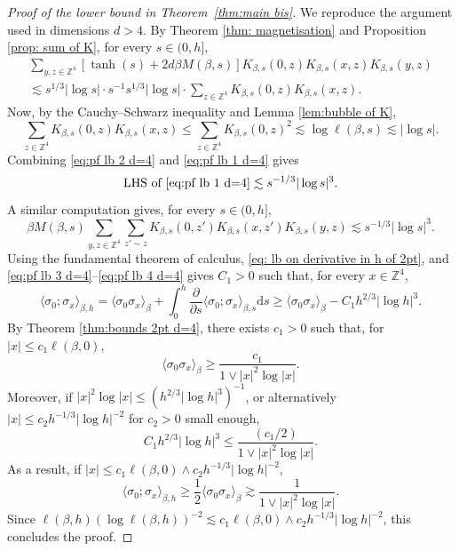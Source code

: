 \documentclass[11pt,a4paper]{article}
\numberwithin{equation}{section}
\theoremstyle{plain}
\theoremstyle{definition}
\begin{document}
\begin{proof}[Proof of the lower bound in Theorem~\textup{\ref{thm:main bis}}] We reproduce the argument used in dimensions $d>4$. By Theorem \ref{thm: magnetisation} and Proposition \ref{prop: sum of K}, for every $s\in (0,h]$,
\begin{multline}\label{eq:pf lb 1 d=4}
	\sum_{y,z\in \mathbb Z^4}[\tanh(s)+2d\beta M(\beta,s)]K_{\beta,s}(0,z)K_{\beta,s}(x,z)K_{\beta,s}(y,z)\\\lesssim s^{1/3}|\log s|\cdot s^{-1} s^{1/3}|\log s| \cdot \sum_{z\in \mathbb Z^4}K_{\beta,s}(0,z)K_{\beta,s}(x,z).
\end{multline}
Now, by the Cauchy--Schwarz inequality and Lemma \ref{lem:bubble of K},
\begin{equation}\label{eq:pf lb 2 d=4}
	\sum_{z\in \mathbb Z^4}K_{\beta,s}(0,z)K_{\beta,s}(x,z)\leq \sum_{z\in \mathbb Z^4} K_{\beta,s}(0,z)^2\lesssim \log \ell(\beta,s)\lesssim |\log s|.
\end{equation}
Combining \eqref{eq:pf lb 2 d=4} and \eqref{eq:pf lb 1 d=4} gives
\begin{equation}\label{eq:pf lb 3 d=4}
	\textup{LHS of \eqref{eq:pf lb 1 d=4}}\lesssim s^{-1/3}|\log s|^3.
\end{equation}
A similar computation gives, for every $s\in(0,h]$,
\begin{equation}\label{eq:pf lb 4 d=4}
	\beta M(\beta,s)\sum_{y,z\in \mathbb Z^4}\sum_{z'\sim z}K_{\beta,s}(0,z')K_{\beta,s}(x,z')K_{\beta,s}(y,z)\lesssim s^{-1/3}|\log s|^3.
\end{equation}
Using the fundamental theorem of calculus, \eqref{eq: lb on derivative in h of 2pt}, and \eqref{eq:pf lb 3 d=4}--\eqref{eq:pf lb 4 d=4} gives $C_1>0$ such that, for every $x\in \mathbb Z^4$,
\begin{equation}\label{eq:pf lb 5 d=4}
	\langle \sigma_0;\sigma_x\rangle_{\beta,h}=\langle \sigma_0\sigma_x\rangle_\beta+\int_0^h \frac{\partial}{\partial s}\langle \sigma_0;\sigma_x\rangle_{\beta,s}\mathrm{d}s\geq \langle \sigma_0\sigma_x\rangle_{\beta}-C_1 h^{2/3}|\log h|^3.
\end{equation}
By Theorem \ref{thm:bounds 2pt d=4}, there exists $c_1>0$ such that, for $|x|\leq c_1\ell(\beta,0)$, 
\begin{equation}
\langle \sigma_0\sigma_x\rangle_{\beta}\geq \frac{c_1}{1\vee |x|^2\log |x|}.
\end{equation}
Moreover, if $|x|^2\log |x|\leq (h^{2/3}|\log h|^3)^{-1}$, or alternatively $|x|\leq c_2 h^{-1/3}|\log h|^{-2}$ for $c_2>0$ small enough,
\begin{equation}
	C_1 h^{2/3}|\log h|^3\leq \frac{(c_1/2)}{1\vee |x|^2\log |x|}.
\end{equation}
As a result, if $|x|\leq c_1\ell(\beta,0)\wedge c_2 h^{-1/3}|\log h|^{-2}$,
\begin{equation}
	\langle \sigma_0;\sigma_x\rangle_{\beta,h}\geq \frac{1}{2}\langle \sigma_0\sigma_x\rangle_{\beta}\gtrsim \frac{1}{1\vee |x|^2\log |x|}.
\end{equation}
Since $\ell(\beta,h)(\log \ell(\beta,h))^{-2}\lesssim c_1\ell(\beta,0)\wedge c_2 h^{-1/3}|\log h|^{-2}$, this concludes the proof.
\end{proof}








\end{document}
